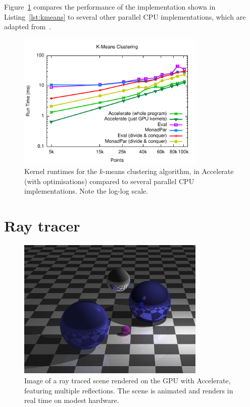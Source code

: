 Figure~\ref{fig:kmeans} compares the performance of the implementation shown in
Listing~\ref{lst:kmeans} to several other parallel CPU implementations, which
are adapted from~\cite{Marlow:2013wn}.


\begin{figure}
    \begin{center}
        \includegraphics[width=0.8\textwidth]{images/sec-6/k-means/k-means}
    \end{center}
    \caption[K-means clustering kernel benchmarks]{Kernel runtimes for the
    $k$-means clustering algorithm, in Accelerate (with optimisations) compared
    to several parallel CPU implementations. Note the log-log scale.}
\label{fig:kmeans}
\end{figure}


\section{Ray tracer}
\label{sec:ray}

\begin{figure}
    \centering
    \includegraphics[width=0.8\textwidth]{images/sec-6/ray/ray_sample}
    \caption[Ray tracer]{Image of a ray traced scene rendered on the GPU with
    Accelerate, featuring multiple reflections. The scene is animated and
    renders in real time on modest hardware.}
    \label{fig:ray_sample}
\end{figure}

